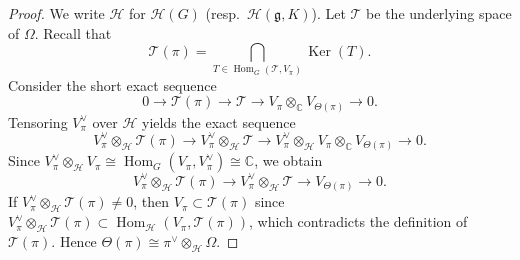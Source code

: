 \documentclass[10pt,a4paper]{amsart}
\DeclareMathOperator{\Hom}{Hom}
\DeclareMathOperator{\Ker}{Ker}
\begin{document}
\begin{proof}
We write $\mathcal{H}$ for $\mathcal{H}(G)$ (resp.\ $\mathcal{H}(\mathfrak{g},K)$).
Let $\mathcal{T}$ be the underlying space of $\Omega$.
Recall that
\[
\mathcal{T}(\pi)=\bigcap_{T\in \Hom_{G}(\mathcal{T},V_{\pi})}\Ker(T).
\]
Consider the short exact sequence
\[
0\to \mathcal{T}(\pi)\to \mathcal{T} \to V_{\pi}\otimes_{\mathbb{C}} V_{\Theta(\pi)}\to 0.
\]
Tensoring $V_{\pi}^{\vee}$ over $\mathcal{H}$ yields the exact sequence
\[
V_{\pi}^{\vee}\otimes_{\mathcal{H}}\mathcal{T}(\pi)\to V_{\pi}^{\vee}\otimes_{\mathcal{H}}\mathcal{T} \to V_{\pi}^{\vee}\otimes_{\mathcal{H}}V_{\pi}\otimes_{\mathbb{C}} V_{\Theta(\pi)}\to 0.
\]
Since $V_{\pi}^{\vee}\otimes_{\mathcal{H}}V_{\pi}\cong \Hom_{G}(V_{\pi},V_{\pi}^{\vee})\cong\mathbb{C}$, we obtain
\[
V_{\pi}^{\vee}\otimes_{\mathcal{H}}\mathcal{T}(\pi)\to V_{\pi}^{\vee}\otimes_{\mathcal{H}}\mathcal{T} \to  V_{\Theta(\pi)}\to 0.
\]
If $V_{\pi}^{\vee}\otimes_{\mathcal{H}}\mathcal{T}(\pi)\neq 0$, then
$V_{\pi}\subset \mathcal{T}(\pi)$ since
$V_{\pi}^{\vee}\otimes_{\mathcal{H}}\mathcal{T}(\pi)\subset \Hom_{\mathcal{H}}(V_{\pi},\mathcal{T}(\pi))$,
which contradicts the definition of $\mathcal{T}(\pi)$.
Hence $\Theta(\pi)\cong\pi^{\vee}\otimes_{\mathcal{H}}\Omega$.
\end{proof}
\end{document}
